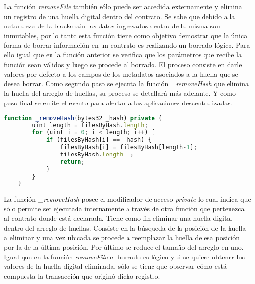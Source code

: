 La función \textit{removeFile} también sólo puede ser accedida externamente y elimina un registro de una huella digital dentro del contrato. Se sabe que debido a la naturaleza de la blockchain los datos ingresados dentro de la misma son inmutables, por lo tanto esta función tiene como objetivo demostrar que la única forma de borrar información en un contrato es realizando un borrado lógico. Para ello igual que en la función anterior se verifica que los parámetros que recibe la función sean válidos y luego se procede al borrado. El proceso consiste en darle valores por defecto a los campos de los metadatos asociados a la huella que se desea borrar. Como segundo paso se ejecuta la función \textit{\_removeHash} que elimina la huella del arreglo de huellas, su proceso se detallará más adelante. Y como paso final se emite el evento para alertar a las aplicaciones descentralizadas.

\begin{minipage}{\linewidth}
  \begin{lstlisting}[frame=single, belowskip=1em, aboveskip=2em,  language=javascript, captionpos=b, caption=Función \_removeHash, label={lst:post_archivo}]
    function _removeHash(bytes32 _hash) private {
        uint length = filesByHash.length;
        for (uint i = 0; i < length; i++) {
            if (filesByHash[i] == _hash) {
                filesByHash[i] = filesByHash[length-1];
                filesByHash.length--;
                return;
            }
        }
    }
  \end{lstlisting}
\end{minipage}

La función \textit{\_removeHash} posee el modificador de acceso \textit{private} lo cual indica que sólo permite ser ejecutada internamente a través de otra función que pertenezca al contrato donde está declarada. Tiene como fin eliminar una huella digital dentro del arreglo de huellas. Consiste en la búsqueda de la posición de la huella a eliminar y una vez ubicada se procede a reemplazar la huella de esa posición por la de la última posición. Por último se reduce el tamaño del arreglo en uno. Igual que en la función \textit{removeFile} el borrado es lógico y si se quiere obtener los valores de la huella digital eliminada, sólo se tiene que observar cómo está compuesta la transacción que originó dicho registro.

